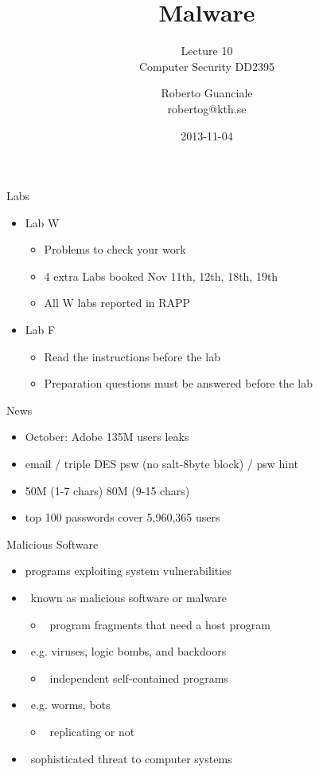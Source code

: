 \documentclass{beamer}
\title{Malware}
\subtitle{Lecture 10 \\ Computer Security DD2395}
\author[R. Guanciale]{
  Roberto Guanciale\\
  robertog@kth.se
}
\date{2013-11-04}
\begin{document}
\begin{frame}[plain]
  \titlepage
\end{frame}

\begin{frame}{Labs}
  \begin{itemize}
  \item Lab W
    \begin{itemize}
      \item Problems to check your work
      \item 4 extra Labs booked Nov 11th, 12th, 18th, 19th
      \item All W labs reported in RAPP
    \end{itemize}
  \item Lab F
    \begin{itemize}
      \item Read the instructions before the lab
      \item Preparation questions must be answered before the lab
    \end{itemize}
  \end{itemize}
\end{frame}

\begin{frame}{News}
  \begin{itemize}
  \item October: Adobe 135M users leaks
  \item email / triple DES psw (no salt-8byte block) / psw hint
  \item 50M (1-7 chars) 80M (9-15 chars)
  \item top 100 passwords cover 5,960,365 users
  \end{itemize}
\end{frame}

\begin{frame}{Malicious Software}
  \begin{itemize}
  \item programs exploiting system vulnerabilities 
  \item  known as malicious software or malware 
    \begin{itemize}
    \item  program fragments that need a host program  
    \end{itemize}
  \item  e.g. viruses, logic bombs, and backdoors 
    \begin{itemize}
    \item  independent self-contained programs 
    \end{itemize}
  \item  e.g. worms, bots 
    \begin{itemize}
    \item  replicating or not 
    \end{itemize}
  \item  sophisticated threat to computer systems 
  \end{itemize}
\end{frame}
\end{document}
